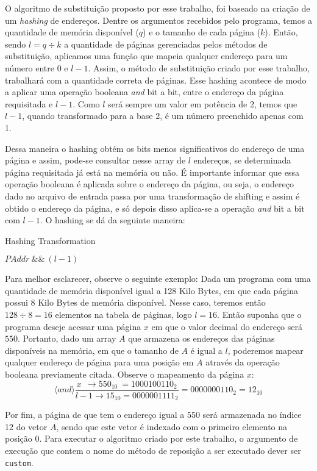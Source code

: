 O algoritmo de substituição proposto por esse trabalho, foi baseado na criação
de um \textit{hashing} de endereços.
Dentre os argumentos recebidos pelo programa, temos a quantidade de memória
disponível ($q$) e o tamanho de cada página ($k$).
Então, sendo $l = q\div k$ a quantidade de páginas gerenciadas pelos métodos
de substituição, aplicamos uma função que mapeia qualquer endereço para um
número entre $0$ e $l-1$.
Assim, o método de substituição criado por esse trabalho, trabalhará com a
quantidade correta de páginas.
Esse hashing acontece de modo a aplicar uma operação booleana \textit{and}
bit a bit, entre o endereço da página requisitada e $l-1$.
Como $l$ será sempre um valor em potência de 2, temos que $l-1$, quando
transformado para a base 2, é um número preenchido apenas com 1.

Dessa maneira o hashing obtém os bits menos significativos do endereço de uma
página e assim, pode-se consultar nesse array de $l$ endereços, se determinada
página requisitada já está na memória ou não.
É importante informar que essa operação booleana é aplicada sobre o endereço
da página, ou seja, o endereço dado no arquivo de entrada passa por uma
transformação de shifting e assim é obtido o endereço da página, e só depois
disso aplica-se a operação \textit{and} bit a bit com $l-1$.
O hashing se dá da seguinte maneira:

\begin{algorithm}
    \caption{Hashing Transformation}\label{alg:transformation}
    \begin{algorithmic}[1]
        
    \Return $PAddr\ \&\&\ (l-1)$   
    \EndFunction
\end{algorithmic}
\end{algorithm}

Para melhor esclarecer, observe o seguinte exemplo:
Dada um programa com uma quantidade de memória disponível igual a 128 Kilo
Bytes, em que cada página possui 8 Kilo Bytes de memória disponível.
Nesse caso, teremos então $128 \div 8 = 16$ elementos na tabela de páginas,
logo $l = 16$.
Então suponha que o programa deseje acessar uma página $x$ em que o valor
decimal do endereço será $550$.
Portanto, dado um array $A$ que armazena os endereços das páginas disponíveis
na memória, em que o tamanho de $A$ é igual a $l$, poderemos mapear qualquer
endereço de página para uma posição em $A$ através da operação booleana
previamente citada.
Observe o mapeamento da página $x$:
$$
\langle\textit{and}\rangle\frac{x\ \ \rightarrow 550_{10}\ = 1000100110_2}{l-1 \rightarrow 15_{10} = 0000001111_2}
= 0000000110_2 = 12_{10}
$$

Por fim, a página de que tem o endereço igual a 550 será armazenada no índice
12 do vetor $A$, sendo que este vetor é indexado com o primeiro elemento na
posição 0.
Para executar o algoritmo criado por este trabalho, o argumento de execução
que contem o nome do método de reposição a ser executado dever ser 
\texttt{custom}.